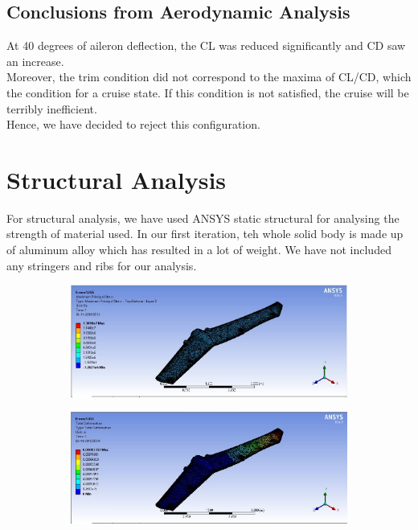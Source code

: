 \subsection{Conclusions from Aerodynamic Analysis}
At 40 degrees of aileron deflection, the CL was reduced significantly and CD saw an increase. \\
Moreover, the trim condition did not correspond to the maxima of CL/CD, which the condition for a cruise state. If this condition is not satisfied, the cruise will be terribly inefficient.\\
Hence, we have decided to reject this configuration.\\

\section{Structural Analysis}
For structural analysis, we have used ANSYS static structural for analysing the strength of material used. 
In our first iteration, teh whole solid body is made up of aluminum alloy which has resulted in a lot of weight.
We have not included any stringers and ribs for our analysis.
\begin{figure}[H]
\begin{subfigure}{0.48\textwidth}
\includegraphics[width = \linewidth]{str1.png}
\end{subfigure}
\begin{subfigure}{0.48\textwidth}
\includegraphics[width = \linewidth]{str2.png}
\end{subfigure}
\end{figure}

